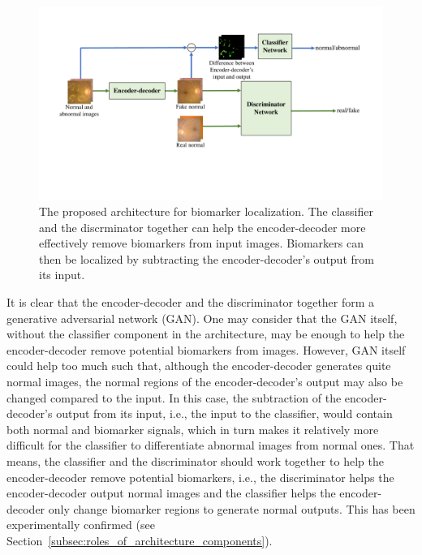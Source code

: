 \documentclass[runningheads]{llncs}
\begin{document}
\begin{figure}[tbp]
	
    \centering
    \includegraphics[width=1.0\linewidth]{images/method} 
    \caption{The proposed architecture for biomarker localization. The classifier and the discrminator together can help the encoder-decoder more effectively remove biomarkers from input images. Biomarkers can then be localized by subtracting the encoder-decoder's output from its input.}\label{fig1}
    \vspace{-0.5cm}
\end{figure}
It is clear that the encoder-decoder and the discriminator together form a generative adversarial network (GAN). One may consider that the GAN itself, without the classifier component in the architecture, may be enough to help the encoder-decoder remove potential biomarkers from images. However, GAN itself could help too much such that, although the encoder-decoder generates quite normal images, the normal regions of the encoder-decoder's output may also be changed compared to the input. In this case, the subtraction of the encoder-decoder's output from its input, i.e., the input to the classifier, would contain both normal and biomarker signals, which in turn makes it relatively more difficult for the classifier to differentiate abnormal images from normal ones. That means, the classifier and the discriminator should work together to help the encoder-decoder remove potential biomarkers, i.e., the discriminator helps the encoder-decoder output normal images and the classifier helps the encoder-decoder only change biomarker regions to generate normal outputs. This has been experimentally confirmed (see Section~\ref{subsec:roles_of_architecture_components}).
\end{document}
